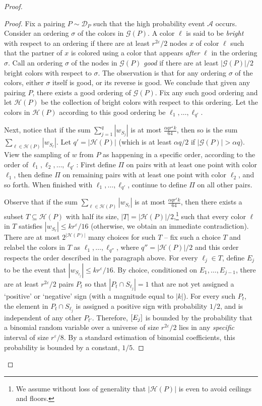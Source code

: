 \documentclass[10pt,a4paper]{article}
\theoremstyle{definition}%
\theoremstyle{plain}
\let\Pr\relax
\DeclareMathOperator*{\Pr}{\mathbb{P}}
\newcommand{\eps}{\varepsilon}
\newcommand{\calA}{\mathcal{A}}
\newcommand{\calD}{\mathcal{D}}
\newcommand{\calG}{\mathcal{G}}
\newcommand{\calH}{\mathcal{H}}
\begin{document}
\begin{proof}
\begin{proof}
Fix a pairing $P\sim \calD_P$ such that the high probability event $\calA$ occurs. Consider an ordering $\sigma$ of the colors in $\calG(P)$. A color $\ell$ is said to be \emph{bright} with respect to an ordering if there are at least $r^{2\eps}/2$ nodes $x$ of color $\ell$ such that the partner of $x$ is colored using a color that appears \emph{after} $\ell$ in the ordering $\sigma$.  Call an ordering $\sigma$ of the nodes in $\calG(P)$ \emph{good} if there are at least $|\calG(P)|/2$ bright colors  with respect to $\sigma$. The observation is that for any ordering $\sigma$ of the colors, either $\sigma$ itself is good, or its reverse is good. We conclude that given any pairing $P$, there exists a good ordering of $\calG(P)$. Fix any such good ordering and let $\calH(P)$ be the collection of bright colors with respect to this ordering. Let the colors in $\calH(P)$ according to this good ordering be $\ell_1,\ldots, \ell_{q'}$.

Next, notice that if the sum $\sum_{j=1}^{q}|w_{S_j}|$ is at most $\frac{\alpha qr^\eps k}{64}$, then so is the sum $\sum_{\ell\in \calH(P)}|w_{S_\ell}|$. Let $q' = |\calH(P)|$ (which is at least $\alpha q/2$ if $|\calG(P)|>\alpha q$). View the sampling of $w$ from $P$ as happening in a specific order, according to the order
of $\ell_1, \ell_2, \ldots, \ell_{q'}$: First define $\Pi$ on pairs with at least one point with color $\ell_1$, then define $\Pi$ on
remaining pairs with at least one point with color $\ell_2$, and so forth. When finished with $\ell_1,\ldots, \ell_{q'}$,
continue to define $\Pi$ on all other pairs.

Observe that if the sum $\sum_{\ell\in \calH(P)}|w_{S_\ell}|$ is at most $\frac{\alpha qr^\eps k}{64}$, then there exists a subset $T\subseteq \calH(P)$ with half its size, $|T|= |\calH(P)|/2$,\footnote{We assume without loss of generality that $|\calH(P)|$ is even to avoid ceilings and floors.} such that every color $\ell$ in $T$ satisfies $|w_{S_\ell}|\leq kr^\eps /16$ (otherwise, we obtain an immediate contradiction). There are at most $2^{|\calH(P)|}$ many choices for such $T$ -- fix such a choice $T$ and relabel the colors in $T$ as $\ell_1,\ldots, \ell_{q''}$, where $q'' = |\calH(P)|/2$ and this order respects the order described in the paragraph above.
For every $\ell_j\in T$, define $E_j$ to be the event that $|w_{S_{\ell_j}}|\leq kr^\eps /16$. 
By choice, conditioned on $E_1,\ldots, E_{j-1}$, there are at least $r^{2\eps}/2$ pairs $P_t$ so that
$|P_t \cap S_{\ell_j}| = 1$ that are not yet assigned a `positive' or `negative' sign (with a magnitude equal to $|k|$). For every such $P_t$, the element in $P_t \cap S_{\ell_j}$
is assigned a positive sign with probability $1/2$, and is independent of any other $P_{t'}$. Therefore, $\Pr[E_j]$ is bounded by the probability that a binomial random variable over a universe of size $r^{2\eps}/2$ lies in any \emph{specific} interval of size $r^\eps/8$. By a standard estimation of binomial coefficients, this probability is bounded by a constant, $1/5$.


\end{proof}
\end{proof}
\end{document}
